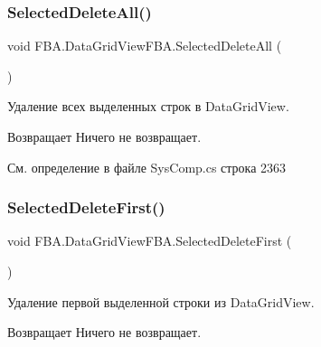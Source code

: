 \mbox{\label{class_f_b_a_1_1_data_grid_view_f_b_a_ac4aed4d493c86b920a56db4cda551d97}} 
\subsubsection{\texorpdfstring{Selected\+Delete\+All()}{SelectedDeleteAll()}}
{\footnotesize\ttfamily void F\+B\+A.\+Data\+Grid\+View\+F\+B\+A.\+Selected\+Delete\+All (\begin{DoxyParamCaption}{ }\end{DoxyParamCaption})}



Удаление всех выделенных строк в Data\+Grid\+View. 

\begin{DoxyReturn}{Возвращает}
Ничего не возвращает.
\end{DoxyReturn}


См. определение в файле Sys\+Comp.\+cs строка 2363

\mbox{\label{class_f_b_a_1_1_data_grid_view_f_b_a_a3ecc31f2d95f2f000bc37f1d305a4a1e}} 
\subsubsection{\texorpdfstring{Selected\+Delete\+First()}{SelectedDeleteFirst()}}
{\footnotesize\ttfamily void F\+B\+A.\+Data\+Grid\+View\+F\+B\+A.\+Selected\+Delete\+First (\begin{DoxyParamCaption}{ }\end{DoxyParamCaption})}



Удаление первой выделенной строки из Data\+Grid\+View. 

\begin{DoxyReturn}{Возвращает}
Ничего не возвращает.
\end{DoxyReturn}


